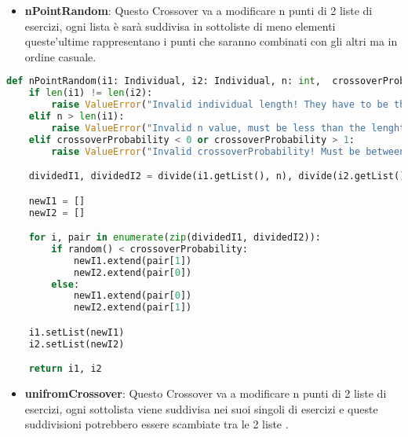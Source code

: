 \documentclass{article}
\begin{document}
\pagebreak

\begin{itemize}
\item\textbf{nPointRandom}: Questo Crossover va a modificare n punti di 2 liste di esercizi, ogni lista è sarà suddivisa in sottoliste di meno elementi queste'ultime rappresentano i punti che saranno combinati con gli altri ma in ordine casuale.
\end{itemize}

\begin{lstlisting}[language=Python, breaklines, no caption]
def nPointRandom(i1: Individual, i2: Individual, n: int,  crossoverProbability: float) -> tuple[Individual, Individual]:
    if len(i1) != len(i2):
        raise ValueError("Invalid individual length! They have to be the same.")
    elif n > len(i1):
        raise ValueError("Invalid n value, must be less than the lenght of the individual!")
    elif crossoverProbability < 0 or crossoverProbability > 1:
        raise ValueError("Invalid crossoverProbability! Must be between 0 and 1")

    dividedI1, dividedI2 = divide(i1.getList(), n), divide(i2.getList(), n)

    newI1 = []
    newI2 = []

    for i, pair in enumerate(zip(dividedI1, dividedI2)):
        if random() < crossoverProbability:
            newI1.extend(pair[1])
            newI2.extend(pair[0])
        else:
            newI1.extend(pair[0])
            newI2.extend(pair[1])

    i1.setList(newI1)
    i2.setList(newI2)

    return i1, i2
\end{lstlisting}

\pagebreak

\begin{itemize}
\item\textbf{unifromCrossover}: Questo Crossover va a modificare n punti di 2 liste di esercizi, ogni sottolista viene suddivisa nei suoi singoli di esercizi e queste suddivisioni potrebbero essere scambiate tra le 2 liste .
\end{itemize}
\end{document}
